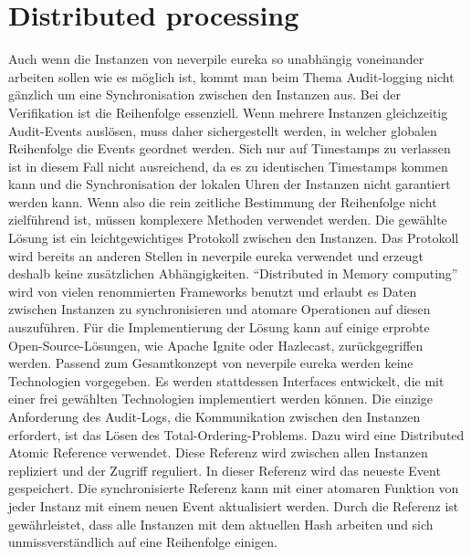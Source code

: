 \section{Distributed processing}
Auch wenn die Instanzen von neverpile eureka so unabhängig voneinander arbeiten sollen wie es möglich ist, kommt man beim Thema Audit-logging nicht gänzlich um eine Synchronisation zwischen den Instanzen aus. Bei der Verifikation ist die Reihenfolge essenziell. Wenn mehrere Instanzen gleichzeitig Audit-Events auslösen, muss daher sichergestellt werden, in welcher globalen Reihenfolge die Events geordnet werden. Sich nur auf Timestamps zu verlassen ist in diesem Fall nicht ausreichend, da es zu identischen Timestamps kommen kann und die Synchronisation der lokalen Uhren der Instanzen nicht garantiert werden kann. Wenn also die rein zeitliche Bestimmung der Reihenfolge nicht zielführend ist, müssen komplexere Methoden verwendet werden. Die gewählte Lösung ist ein leichtgewichtiges Protokoll zwischen den Instanzen. Das Protokoll wird bereits an anderen Stellen in neverpile eureka verwendet und erzeugt deshalb keine zusätzlichen Abhängigkeiten. 
"`Distributed in Memory computing"' wird von vielen renommierten Frameworks benutzt und erlaubt es Daten zwischen Instanzen zu synchronisieren und atomare Operationen auf diesen auszuführen. Für die Implementierung der Lösung kann auf einige erprobte Open-Source-Lösungen, wie Apache Ignite oder Hazlecast, zurückgegriffen werden. Passend zum Gesamtkonzept von neverpile eureka werden keine Technologien vorgegeben. Es werden stattdessen Interfaces entwickelt, die mit einer frei gewählten Technologien implementiert werden können. Die einzige Anforderung des Audit-Logs, die Kommunikation zwischen den Instanzen erfordert, ist das Lösen des Total-Ordering-Problems. Dazu wird eine Distributed Atomic Reference verwendet. Diese Referenz wird zwischen allen Instanzen repliziert und der Zugriff reguliert. In dieser Referenz wird das neueste Event gespeichert. Die synchronisierte Referenz kann mit einer atomaren Funktion von jeder Instanz mit einem neuen Event aktualisiert werden. Durch die Referenz ist gewährleistet, dass alle Instanzen mit dem aktuellen Hash arbeiten und sich unmissverständlich auf eine Reihenfolge einigen.\cite{7496608}
